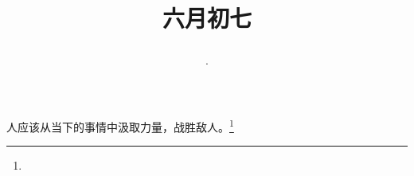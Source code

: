 \title{\date[d=12,m=7,y=2024][year:cn-y,年,month:cn,day:cn,日,·,weekday]·六月初七 }
人应该从当下的事情中汲取力量，战胜敌人。\footnote{ }

